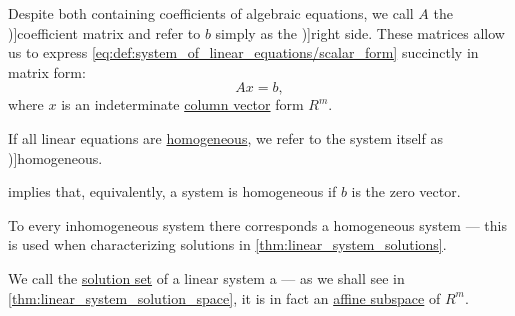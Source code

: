 \begin{definition}
  Despite both containing coefficients of algebraic equations, we call \( A \) the \term[ru=матрица коеффициентов (\cite[\S 3.1]{Тыртышников2007ЛинейнаяАлгебра})]{coefficient matrix} and refer to \( b \) simply as the \term[ru=правая часть (\cite[\S 3.1]{Тыртышников2007ЛинейнаяАлгебра})]{right side}. These matrices allow us to express \eqref{eq:def:system_of_linear_equations/scalar_form} succinctly in matrix form:
  \begin{equation}\label{eq:def:system_of_linear_equations/matrix_form}
    Ax = b,
  \end{equation}
  where \( x \) is an indeterminate \hyperref[def:array/column_vector]{column vector} form \( R^m \).

  \begin{thmenum}
     If all linear equations are \hyperref[def:homogeneous_equation]{homogeneous}, we refer to the system itself as \term[ru=однородная (система алгебраических уравнений) (\cite[\S 7.7]{Тыртышников2007ЛинейнаяАлгебра})]{homogeneous}.

     implies that, equivalently, a system is homogeneous if \( b \) is the zero vector.

    To every inhomogeneous system there corresponds a homogeneous system --- this is used when characterizing solutions in \cref{thm:linear_system_solutions}.

     We call the \hyperref[def:fol_equation/semantic_solution]{solution set} of a linear system a  --- as we shall see in \cref{thm:linear_system_solution_space}, it is in fact an \hyperref[def:affine_subspace]{affine subspace} of \( R^m \).
  \end{thmenum}
\end{definition}

